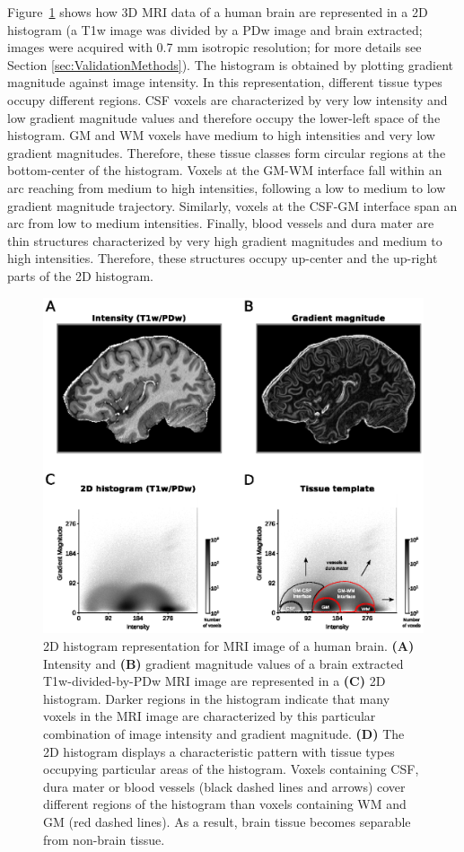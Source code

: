 Figure~\ref{fig:Fig1} shows how 3D MRI data of a human brain are represented in a 2D histogram (a T1w image was divided by a PDw image \parencite{Moortele2009} and brain extracted; images were acquired with 0.7 mm isotropic resolution; for more details see Section \ref{sec:ValidationMethods}). The histogram is obtained by plotting gradient magnitude against image intensity. In this representation, different tissue types occupy different regions. CSF voxels are characterized by very low intensity and low gradient magnitude values and therefore occupy the lower-left space of the histogram. GM and WM voxels have medium to high intensities and very low gradient magnitudes. Therefore, these tissue classes form circular regions at the bottom-center of the histogram. Voxels at the GM-WM interface fall within an arc reaching from medium to high intensities, following a low to medium to low gradient magnitude trajectory. Similarly, voxels at the CSF-GM interface span an arc from low to medium intensities. Finally, blood vessels and dura mater are thin structures characterized by very high gradient magnitudes and medium to high intensities. Therefore, these structures occupy up-center and the up-right parts of the 2D histogram.

\begin{figure}[htb!]
\centering
\includegraphics[width=\textwidth]{figures/chapter_02/figure_1.eps}
\caption{2D histogram representation for MRI image of a human brain.
\textbf{(A)} Intensity and \textbf{(B)} gradient magnitude values of a brain extracted T1w-divided-by-PDw MRI image are represented in a \textbf{(C)} 2D histogram. Darker regions in the histogram indicate that many voxels in the MRI image are characterized by this particular combination of image intensity and gradient magnitude. \textbf{(D)} The 2D histogram displays a characteristic pattern with tissue types occupying particular areas of the histogram. Voxels containing CSF, dura mater or blood vessels (black dashed lines and arrows) cover different regions of the histogram than voxels containing WM and GM (red dashed lines). As a result, brain tissue becomes separable from non-brain tissue.}
\label{fig:Fig1}
\end{figure}

